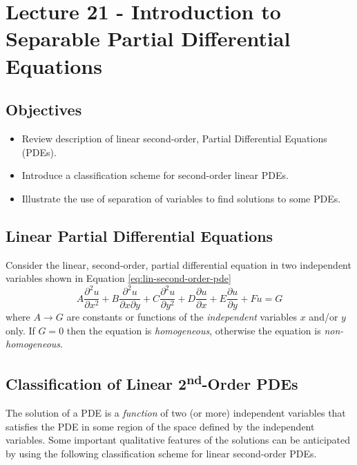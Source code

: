 \chapter{Lecture 21 - Introduction to Separable Partial Differential Equations}
\label{ch:lec21}
\section{Objectives}
\begin{itemize}
\item Review description of linear second-order, Partial Differential Equations (PDEs).
\item Introduce a classification scheme for second-order linear PDEs.
\item Illustrate the use of separation of variables to find solutions to some PDEs.
\end{itemize}

\section{Linear Partial Differential Equations}

Consider the linear, second-order, partial differential equation in two independent variables shown in Equation \ref{eq:lin-second-order-pde}
\begin{equation}
A\frac{\partial^2u}{\partial x^2} + B\frac{\partial^2 u}{\partial x \partial y} + C\frac{\partial^2 u}{\partial y^2} + D \frac{\partial u}{\partial x} + E\frac{\partial u}{\partial y} + Fu = G
\label{eq:lin-second-order-pde}
\end{equation}
where $A\rightarrow G$ are constants or functions of the \emph{independent} variables $x$ and/or $y$ only.  If $G=0$ then the equation is \emph{homogeneous}, otherwise the equation is \emph{non-homogeneous}.

\section{Classification of Linear 2\textsuperscript{nd}-Order PDEs}
The solution of a PDE is a \emph{function} of two (or more) independent variables that satisfies the PDE in some region of the space defined by the independent variables.  Some important qualitative features of the solutions can be anticipated by using the following classification scheme for linear second-order PDEs.

